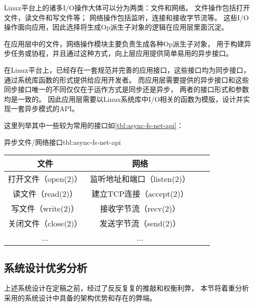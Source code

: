 \documentclass[supercite]{HustGraduPaper}
\newcommand{\rtbl}[1]{\autoref{tbl:#1}}
\theoremstyle{definition}
\begin{document}
Linux平台上的诸多I/O操作大体可以分为两类：文件和网络。
文件操作包括打开文件，读文件和写文件等；
网络操作包括监听，连接和接收字节流等。
这些I/O操作面向应用，因此选择将生成Op派生子对象的逻辑在应用层里面沉淀。\par

在应用层中的文件，网络操作模块主要负责生成各种Op派生子对象，
用于构建异步任务或协程，并且通过这种方式，向上层应用提供简单易用的异步接口。\par

在Linux平台上，已经存在一套规范并完善的应用接口，这些接口均为同步接口，
通过系统库函数的形式提供给应用开发者。
而应用层需要提供的异步接口和这些同步接口唯一的不同仅仅在于运作方式是同步还是异步，
两者的接口形式和参数均是一致的。
因此应用层需要以Linux系统库中I/O相关的函数为模版，设计并实现一套异步模式的API。\par

这里列举其中一些较为常用的接口如\rtbl{async-fs-net-api}：

\begin{generaltab}{异步文件/网络接口}{tbl:async-fs-net-api}
  \begin{tabular}{c|ccc}
    \toprule
    文件 & 网络 \\
    \midrule
    打开文件（open(2)） & 监听地址和端口（listen(2)） \\
    读文件（read(2)） & 建立TCP连接（accept(2)） \\
    写文件（write(2)） & 接收字节流（recv(2)） \\
    关闭文件（close(2)） & 发送字节流（send(2)） \\
    ... & ... \\
    \bottomrule
  \end{tabular}
\end{generaltab}

\subsection{系统设计优劣分析}
上述系统设计在定稿之前，经过了反反复复的推敲和权衡利弊，
本节将着重分析采用的系统设计中具备的架构优势和存在的弊端。\par
\end{document}
